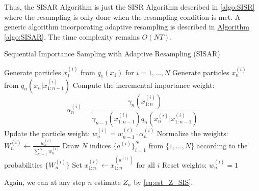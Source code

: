 Thus, the \gls*{SISAR} Algorithm is just the \gls*{SISR} Algorithm described in \cref{algo:SISR} where the resampling is only done when the resampling condition is met. A generic algorithm incorporating adaptive resampling is described in \hyperref[algo:SISAR]{Algorithm \ref*{algo:SISAR}}. The time complexity remains $O(NT)$.
\begin{algorithm}[H]
	\caption{Sequential Importance Sampling with Adaptive Resampling (SISAR)}
	\label{algo:SISAR}
	\begin{algorithmic}[1]
		\State Generate particles \(x_1^{(i)}\) from \( q_1(x_1)\) for \( i = 1, \dots, N \)
		\State Generate particles \(x_n^{(i)}\) from \(q_n(x_n\vert x_{1:n-1}^{(i)})\) 
		\State Compute the incremental importance weight: 
		\[
		\alpha_n^{(i)} = \frac{\gamma_n(x_{1:n}^{(i)})}{\gamma_{n-1}(x_{1:n-1}^{(i)}) q_n(x_n^{(i)} \vert x_{1:n-1}^{(i)})} 
		\] 
		\State Update the particle weight: \( w_n^{(i)} = w_{n-1}^{(i)} \cdot \alpha_n^{(i)} \)
		\EndFor
		\State Normalize the weights: \(W_n^{(i)} \leftarrow \frac{w_n^{(i)}}{\sum_{i=1}^N w_n^{(i)}} \)
		\State Draw \(N\) indices \(\{a^{(i)}\}_{i=1}^N\) from \(\{1,\dots,N\}\) according to the probabilities \(\{W_n^{(i)}\}\)
		\State Set \( x_{1:n}^{(i)} \leftarrow x_{1:n}^{(a^{(i)})} \) for all \( i \)
		\State Reset weights: $w_n^{(i)}=1$
		\EndIf
		\EndFor
	\end{algorithmic}
\end{algorithm}
\noindent Again, we can at any step $n$ estimate $Z_n$ by \cref{eq:est_Z_SIS}. 
